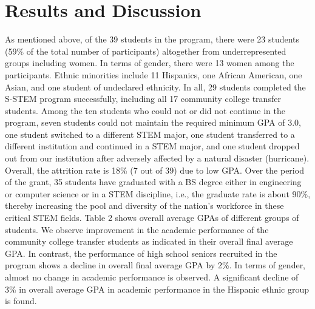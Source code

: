 \documentclass{article}
\begin{document}
\section{Results and Discussion}
As mentioned above, of the 39 students in the program, there were 23 students (59\% of the total number of participants) altogether from underrepresented groups including women. In terms of gender, there were 13 women among the participants. Ethnic minorities include 11 Hispanics, one African American, one Asian, and one student of undeclared ethnicity. In all, 29 students completed the S-STEM program successfully, including all 17 community college transfer students. Among the ten students who could not or did not continue in the program, seven students could not maintain the required minimum GPA of 3.0, one student switched to a different STEM major, one student transferred to a different institution and continued in a STEM major, and one student dropped out from our institution after adversely affected by a natural disaster (hurricane).  Overall, the attrition rate is 18\% (7 out of 39) due to low GPA. Over the period of the grant, 35 students have graduated with a BS degree either in engineering or computer science or in a STEM discipline, i.e., the graduate rate is about 90\%, thereby increasing the pool and diversity of the nation’s workforce in these critical STEM fields.  
Table 2 shows overall average GPAs of different groups of students. We observe improvement in the academic performance of the community college transfer students as indicated in their overall final average GPA. In contrast, the performance of high school seniors recruited in the program shows a decline in overall final average GPA by 2\%. In terms of gender, almost no change in academic performance is observed. A significant decline of 3\% in overall average GPA in academic performance in the Hispanic ethnic group is found.
\end{document}
